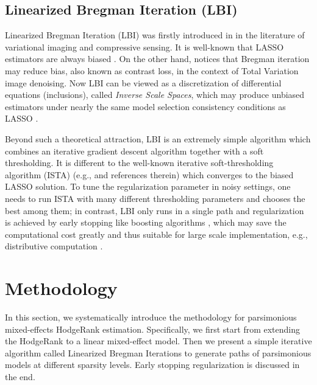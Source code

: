 \documentclass[10pt,journal,cspaper,compsoc]{IEEEtran}
\begin{document}
\subsection{Linearized Bregman Iteration (LBI)}
Linearized Bregman Iteration (LBI) was firstly introduced in \cite{YODG08} in the literature of variational imaging and compressive sensing. It is well-known that LASSO estimators are always biased \cite{Fan2001}. On the other hand, \cite{OBG+05} notices that Bregman iteration may reduce bias, also known as contrast loss, in the context of Total Variation
image denoising. Now LBI can be viewed as a discretization of differential equations (inclusions), called \emph{Inverse Scale Spaces}, %
which may produce unbiased estimators under nearly the same model selection consistency conditions as LASSO \cite{osher2014}. %

Beyond such a theoretical attraction, LBI is an extremely simple algorithm which combines an iterative gradient descent algorithm together with a soft thresholding. It is different to the well-known iterative soft-thresholding algorithm (ISTA) (e.g., \cite{Donoho95,fista} and references therein) which converges to the biased LASSO solution. To tune the regularization parameter in noisy settings, one needs to run ISTA with many different thresholding parameters and chooses the best among them; in contrast, LBI only runs in a single path and regularization is achieved by early stopping like boosting algorithms \cite{osher2014}, which may save the computational cost greatly and thus suitable for large scale implementation, e.g., distributive computation \cite{LBI_decentral}. %
%



\section{Methodology}
\label{sec:methodology}

In this section, we systematically introduce the methodology
for parsimonious mixed-effects HodgeRank estimation. Specifically,
we first start from extending the HodgeRank to a linear mixed-effect model.
Then we present a simple iterative algorithm called Linearized Bregman Iterations to generate paths of parsimonious models at different sparsity levels.
Early stopping regularization is discussed in the end.
\end{document}
